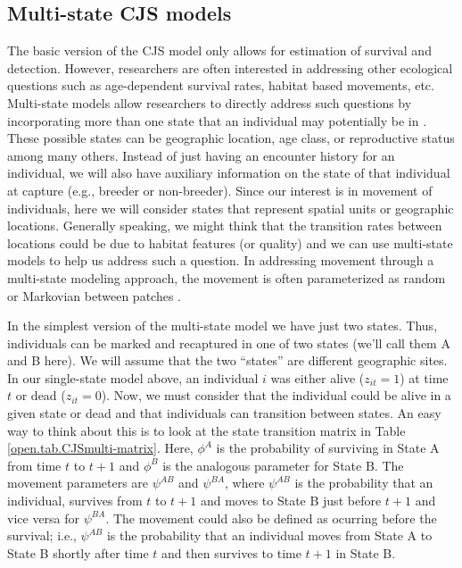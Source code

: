 \subsection{Multi-state CJS models}

The basic version of the CJS model only allows for estimation of
survival and detection.  However, researchers are often interested in
addressing other ecological questions such as age-dependent survival
rates, habitat based movements, etc.  Multi-state models allow
researchers to directly address such questions by incorporating more
than one state that an individual may potentially be in
\citep{arnason:1972,arnason:1973, brownie_etal:1993}.  These possible
states can be geographic location, age class, or reproductive status
among many others.  Instead of just having an encounter history for an
individual, we will also have auxiliary information on the state of
that individual at capture (e.g., breeder or non-breeder).  Since our
interest is in movement of individuals, here we will consider states
that represent spatial units or geographic locations.  Generally
speaking, we might think that the transition rates between locations
could be due to habitat features (or quality) and we can use
multi-state models to help us address such a question.  In addressing
movement through a multi-state modeling approach, the movement is
often parameterized as random or Markovian between patches
\citep{arnason:1972,arnason:1973, schwarz_etal:1993}.

In the simplest version of the multi-state model we have just two states.  Thus, individuals
can be marked and recaptured in one of two states (we'll call them A and B here).
We will assume that the two ``states'' are different
geographic sites.
In our single-state model above, an individual $i$ was either alive ($z_{it}=1$) at time $t$
or dead ($z_{it}=0$).  Now, we must consider that the individual could be alive in a given state or
dead and that individuals can transition between states.  An easy way to think about this is to look at
the state transition matrix in Table \ref{open.tab.CJSmulti-matrix}.
Here, $\phi^A$ 
is the probability of surviving
in State A from time $t$ to $t+1$ and $\phi^B$ is the analogous parameter for State B.  The
movement parameters are $\psi^{AB}$ and $\psi^{BA}$,
where $\psi^{AB}$ is the probability that an individual, survives
from $t$ to $t+1$ and moves to State B just
before $t+1$ and vice versa for $\psi^{BA}$.  The movement could also be 
defined as ocurring before the survival; i.e., $\psi^{AB}$ is the probability that an individual
moves from State A to State B shortly after time $t$ and then survives to 
time $t+1$ in State B.  

